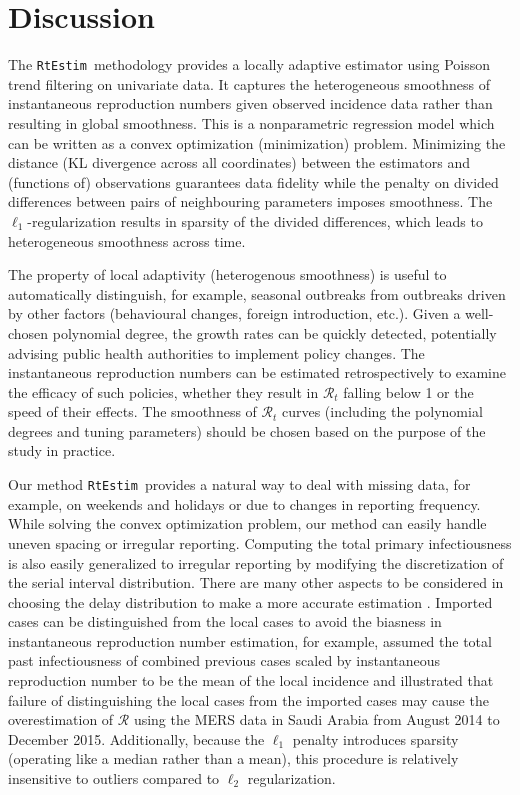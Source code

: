 \documentclass[10pt,letterpaper]{article}
\def\RtEstim{\texttt{RtEstim}}
\def\calR{\mathcal{R}}
\begin{document}
\section{Discussion}
\label{sec:disc}

The \RtEstim\ methodology provides a locally adaptive estimator using Poisson
trend filtering on univariate data. It captures the heterogeneous smoothness of
instantaneous reproduction numbers given observed incidence data rather than
resulting in global smoothness. This is a nonparametric regression model which
can be written as a convex optimization (minimization) problem. Minimizing the
distance (KL divergence across all coordinates) between the estimators and
(functions of) observations guarantees data fidelity while the penalty on divided
differences between pairs of neighbouring parameters imposes smoothness. The
$\ell_1$-regularization results in sparsity of the divided differences, which
leads to heterogeneous smoothness across time. 


The property of local adaptivity (heterogenous smoothness) is useful to
automatically distinguish, for example, seasonal outbreaks from outbreaks driven
by other factors (behavioural changes, foreign introduction, etc.). Given a
well-chosen polynomial degree, the growth rates can be quickly detected, 
potentially advising public health authorities to implement policy changes. The instantaneous
reproduction numbers can be estimated retrospectively to examine the efficacy of
such policies, whether they result in $\calR_t$ falling below 1 or the speed of
their effects. The smoothness of $\calR_t$ curves (including the polynomial 
degrees and tuning parameters) should be chosen based on the purpose of the 
study in practice. 


Our method \RtEstim\ provides a natural way to deal with missing data, for
example, on weekends and holidays or due to changes in reporting frequency.
While solving the convex optimization problem, our method can easily 
handle uneven spacing or irregular reporting. Computing the total
primary infectiousness is also easily generalized to irregular reporting by
modifying the discretization of the serial interval distribution. There are many
other aspects to be considered in choosing the delay distribution to make a more accurate
estimation \cite{park2024estimating}. 
Imported cases can be distinguished from the local cases to avoid the biasness 
in instantaneous reproduction number estimation, for example, \cite{thompson2019improved} 
assumed the total past infectiousness of combined previous cases scaled by instantaneous 
reproduction number to be the mean of the local incidence and illustrated that 
failure of distinguishing the local cases from the imported cases may cause the overestimation 
of $\calR$ using the MERS data in Saudi Arabia from August 2014 to December 2015. 
Additionally, because the $\ell_1$ penalty introduces sparsity (operating like a median
rather than a mean), this procedure is relatively insensitive to outliers
compared to $\ell_2$ regularization.
\end{document}
